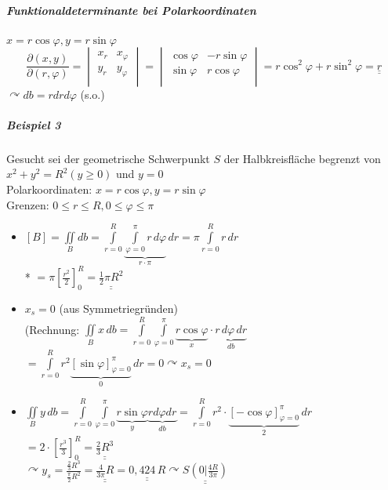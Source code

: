 \documentclass[a4paper]{scrartcl}
\begin{document}
\subparagraph{Funktionaldeterminante bei Polarkoordinaten} $x=r \cos{\varphi}, y= r \sin{\varphi}$
\[\frac{\partial (x,y)}{\partial (r,\varphi)} = \begin{vmatrix} x_r & x_\varphi\\ y_r & y_\varphi\\ \end{vmatrix} = \begin{vmatrix} \cos{\varphi} & -r \sin{\varphi} \\ \sin{\varphi} & r \cos{\varphi} \\ \end{vmatrix} = r \cos^2{\varphi} + r \sin^2{\varphi} = \underline{\underline{r}}\]
$\curvearrowright db = r dr d\varphi$ (s.o.)

\subparagraph{Beispiel 3} Gesucht sei der geometrische Schwerpunkt $S$ der Halbkreisfläche begrenzt von $x^2 +y^2 = R^2 (y \geq 0)$ und $y=0$\\
Polarkoordinaten: $x = r \cos{\varphi}, y=r\sin{\varphi}$\\
Grenzen: $ 0 \leq r \leq R, 0 \leq \varphi \leq \pi$\\
\begin{itemize}
\item $[B] = \iint\limits_{B} db = \int\limits_{r=0}^{R} \underbrace{\int\limits_{\varphi = 0}^{\pi} r \, d\varphi}_{r \cdot \pi} \, dr = \pi \int\limits_{r=0}^{R} r \, dr$\\*
$=\pi \left [ \frac{r^2}{2} \right ]_0^R = \underline{\underline{\frac{1}{2} \pi R^2}}$
\item $x_s = 0$ (aus Symmetriegründen)\\
(Rechnung: $\iint\limits_{B} x \, db = \int\limits_{r=0}^{R} \int\limits_{\varphi = 0}^{\pi} \underbrace{r \cos{\varphi}}_{x} \cdot \underbrace{r \, d\varphi \, dr}_{db}$\\
$= \int\limits_{r=0}^R r^2 \underbrace{[ \sin{\varphi} ]_{\varphi=0}^\pi }_{0} \, dr = 0 \curvearrowright x_s = 0$
\item $\iint\limits_{B} y \, db = \int\limits_{r=0}^{R} \int\limits_{\varphi =0}^{\pi} \underbrace{r \sin{\varphi}}_{y} \underbrace{r d\varphi dr}_{db} = \int\limits_{r=0}^{R} r^2 \cdot \underbrace{\left [- \cos{\varphi} \right ]_{\varphi = 0}^{\pi}}_{2} \, dr$\\
$=2 \cdot [\frac{r^3}{3}]_0^R = \underline{\underline{\frac{2}{3} R^3}}$\\
$\curvearrowright y_s = \frac{\frac{2}{3} R^3}{\frac{\pi}{2} R^2} = \underline{\underline{\frac{4}{3\pi} R}} = \underline{\underline{0,424 \, R}} \curvearrowright \underline{\underline{ S \left (0 | \frac{4R}{3\pi} \right ) }}$

\end{itemize}
\end{document}

